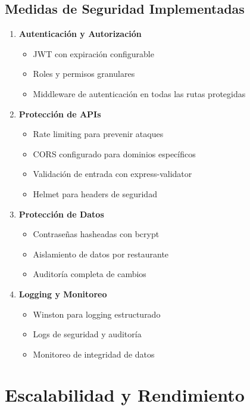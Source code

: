 \documentclass[12pt,a4paper]{article}
\begin{document}
\subsection{Medidas de Seguridad Implementadas}
\begin{enumerate}
    \item \textbf{Autenticación y Autorización}
    \begin{itemize}
        \item JWT con expiración configurable
        \item Roles y permisos granulares
        \item Middleware de autenticación en todas las rutas protegidas
    \end{itemize}
    
    \item \textbf{Protección de APIs}
    \begin{itemize}
        \item Rate limiting para prevenir ataques
        \item CORS configurado para dominios específicos
        \item Validación de entrada con express-validator
        \item Helmet para headers de seguridad
    \end{itemize}
    
    \item \textbf{Protección de Datos}
    \begin{itemize}
        \item Contraseñas hasheadas con bcrypt
        \item Aislamiento de datos por restaurante
        \item Auditoría completa de cambios
    \end{itemize}
    
    \item \textbf{Logging y Monitoreo}
    \begin{itemize}
        \item Winston para logging estructurado
        \item Logs de seguridad y auditoría
        \item Monitoreo de integridad de datos
    \end{itemize}
\end{enumerate}

\section{Escalabilidad y Rendimiento}
\end{document}
